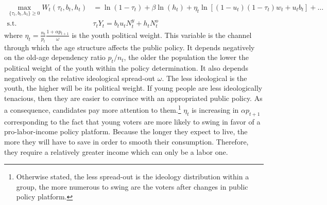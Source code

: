 \begin{align*}
	\max_{\lbrace\tau_t, b_t, h_t\rbrace\geq 0} W_t(\tau_t, b_t, h_t) &= \ln(1-\tau_t) +\beta \ln(h_t) + \eta_t \ln\left[(1-u_t)(1-\tau_t)w_t + u_t b_t\right] + \dots \\
	\text{s.t.} ~~ &\tau_t Y_t = b_t u_t N^y_t + h_t N^o_t
\end{align*}
where $\eta_t = \frac{n_t}{p_t}\frac{1+\alpha p_{t+1}}{\omega}$ is the youth political weight. This variable is the channel through which the age structure affects the public policy. It depends negatively on the old-age dependency ratio $p_t/n_t$, the older the population the lower the political weight of the youth within the policy determination. It also depends negatively on the relative ideological spread-out $\omega$. The less ideological is the youth, the higher will be its political weight. If young people are less ideologically tenacious, then they are easier to convince with an appropriated public policy. As a consequence, candidates pay more attention to them.\footnote{Otherwise stated, the less spread-out is the ideology distribution within a group, the more numerous to swing are the voters after changes in public policy platform.} $\eta_t$ is increasing in $\alpha p_{t+1}$ corresponding to the fact that young voters are more likely to swing in favor of a pro-labor-income policy platform. Because the longer they expect to live, the more they will have to save in order to smooth their consumption. Therefore, they require a relatively greater income which can only be a labor one.

